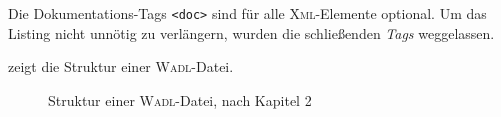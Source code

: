 Die Dokumentations-Tags \texttt{<doc>} sind für alle \textsc{Xml}-Elemente optional.
Um das Listing nicht unnötig zu verlängern, wurden die schließenden \emph{Tags} weggelassen.

 zeigt die Struktur einer \textsc{Wadl}-Datei.

\newpage

\begin{figure}
    \centering
    \resizebox{!}{\textwidth}{
        
    }
    \caption{Struktur einer \textsc{Wadl}-Datei, nach Kapitel 2 \cite{hadleyWADL}}
    \label{fig:wadlstructure}
\end{figure}